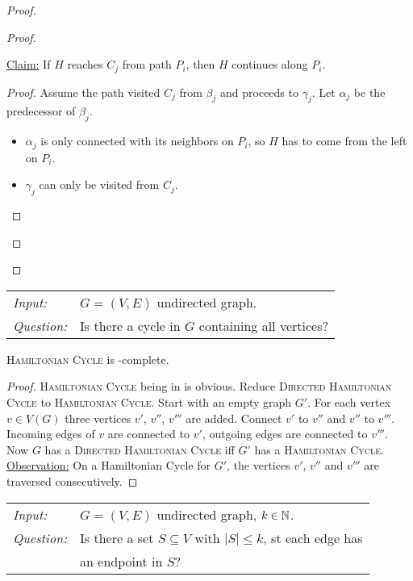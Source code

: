 \documentclass[../skript.tex]{subfiles}
\begin{document}
\begin{proof}
\begin{proof}
\begin{itemize}
\underline{Claim:} If $H$ reaches $C_j$ from path $P_i$, then $H$ continues along $P_i$.
\begin{proof}
Assume the path visited $C_j$ from $\beta_j$ and proceeds to $\gamma_j$. Let $\alpha_j$ be the predecessor of $\beta_j$.
\begin{itemize}
\item $\alpha_j$ is only connected with its neighbors on $P_i$, so $H$ has to come from the left on $P_i$.
\item $\gamma_j$ can only be visited from $C_j$.
\end{itemize}
\end{proof}
\end{itemize}
\end{proof}
\end{proof}
\begin{problem}
\begin{tabular}{@{}ll}
\textit{Input:} & $G = (V, E)$ undirected graph. \\
\textit{Question:} & Is there a cycle in $G$ containing all vertices?
\end{tabular}
\end{problem}
\begin{theorem} %
\label{thm:7}
\textsc{Hamiltonian Cycle} is \NP-complete.
\end{theorem}
\begin{proof}
\textsc{Hamiltonian Cycle} being in \NP{} is obvious.
Reduce \textsc{Directed Hamiltonian Cycle} to \textsc{Hamiltonian Cycle}.
Start with an empty graph $G'$. For each vertex $v \in V(G)$ three vertices $v'$, $v''$, $v'''$ are added. Connect $v'$ to $v''$ and $v''$ to $v'''$. Incoming edges of $v$ are connected to $v'$, outgoing edges are connected to $v'''$.
Now $G$ has a \textsc{Directed Hamiltonian Cycle} \ac{iff} $G'$ has a \textsc{Hamiltonian Cycle}. \\
\underline{Observation:} On a Hamiltonian Cycle for $G'$, the vertices $v'$, $v''$ and $v'''$ are traversed consecutively.
\end{proof}
\begin{problem}
\begin{tabular}{@{}ll}
\textit{Input:} & $G = (V, E)$ undirected graph, $k \in \mathbb{N}$. \\
\textit{Question:} & Is there a set $S \subseteq V$ with $|S| \leq k$, \ac{st} each edge has \\
& an endpoint in $S$?
\end{tabular}
\end{problem}
\end{document}

